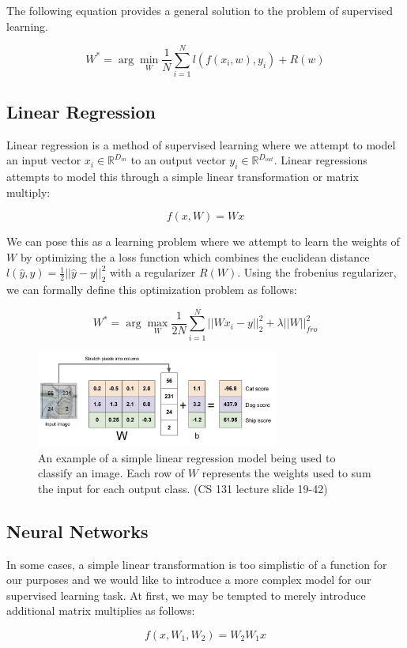 \documentclass{article}
\begin{document}
The following equation provides a general solution to the problem of supervised learning. 

$$W^* = \arg\min_{W} \frac{1}{N} \sum_{i=1}^{N} l(f(x_{i},w),y_{i}) + R(w)$$


\subsection{Linear Regression}
Linear regression is a method of supervised learning where we attempt to model an input vector $x_i\in \mathbb{R}^{D_{in}}$ to an output vector $y_i\in \mathbb{R}^{D_{out}}$. Linear regressions attempts to model this through a simple linear transformation or matrix multiply:

$$f(x, W) = Wx$$

We can pose this as a learning problem where we attempt to learn the weights of $W$ by optimizing the a loss function which combines the euclidean distance $l(\hat{y},y) = \frac{1}{2} ||\hat{y} - y||_2^2$ with a regularizer $R(W)$. Using the frobenius regularizer, we can formally define this optimization problem as follows:

$$W^* = \arg\max_{W} \frac{1}{2N} \sum_{i=1}^{N} ||Wx_i - y||_2^2 + \lambda ||W||_{fro}^2$$

\begin{figure}[h]
\includegraphics[width=8cm]{Linear_regression.png}
\centering
\caption{An example of a simple linear regression model being used to classify an image. Each row of $W$ represents the weights used to sum the input for each output class. (CS 131 lecture slide 19-42)}
\end{figure}
\subsection{Neural Networks}
In some cases, a simple linear transformation is too simplistic of a function for our purposes and we would like to introduce a more complex model for our supervised learning task. At first, we may be tempted to merely introduce additional matrix multiplies as follows:

$$f(x, W_1, W_2) = W_2W_1x$$
\end{document}
